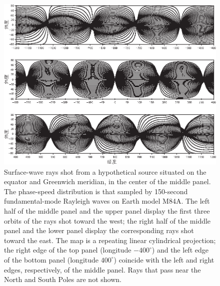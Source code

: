 \begin{figure}[!t]
\begin{center}
\includegraphics{../figures/chap16/fig05.eps}
\end{center}
\caption[orbits]{\label{fig:16.orbits}
Surface-wave rays shot from a
hypothetical source situated on the equator and
Greenwich meridian, in the center of the middle panel.
The phase-speed distribution is that sampled
by 150-second fundamental-mode Rayleigh waves
on Earth model M84A.  The left half of the middle
panel and the upper panel display the first three
orbits of the rays shot toward the west; the right
half of the middle panel and the lower panel display
the corresponding rays shot toward the east.  The map
is a repeating linear cylindrical projection; the right
edge of the top panel (longitude $-400^\circ$) and the
left edge of the bottom panel (longitude $400^\circ$)
coincide with the left and right edges, respectively,
of the middle panel.  Rays that pass near the North
and South Poles are not shown.}
\end{figure}

